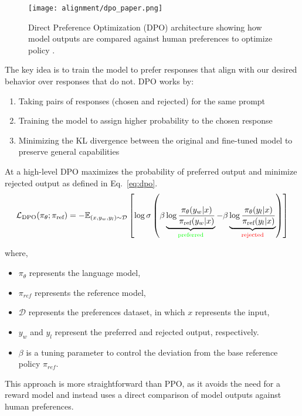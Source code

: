 \begin{figure}[H]
\centering
\texttt{[image: alignment/dpo\_paper.png]}
\caption{Direct Preference Optimization (DPO) architecture showing how model outputs are compared against human preferences to optimize policy \cite{rafailov2024directpreferenceoptimizationlanguage}.}
\label{fig:dpo-paper}
\end{figure}

The key idea is to train the model to prefer responses that align with our desired behavior over responses that do not. DPO works by:
\begin{enumerate}
\item Taking pairs of responses (chosen and rejected) for the same prompt
\item Training the model to assign higher probability to the chosen response
\item Minimizing the KL divergence between the original and fine-tuned model to preserve general capabilities
\end{enumerate}

At a high-level DPO maximizes the probability of preferred output and minimize rejected output as defined in Eq.~\ref{eq:dpo}.
\begin{equation}\label{eq:dpo}
\mathcal{L}_{\text{DPO}}(\pi_\theta; \pi_\text{ref}) = -\mathbb{E}_{(x,y_w,y_l) \sim \mathcal{D}} \left[\log \sigma \left(\beta \underbrace{\log \frac{\pi_\theta(y_w | x)}{\pi_\text{ref}(y_w | x)}}_{\color{green}\text{preferred}} - \beta \underbrace{\log \frac{\pi_\theta(y_l | x)}{\pi_\text{ref}(y_l | x)}}_{\color{red}\text{rejected}}\right)\right]
\end{equation}

where,
\begin{itemize}
\item $\pi_\theta$ represents the language model,
\item $\pi_{ref}$ represents the reference model,
\item $\mathcal{D}$ represents the preferences dataset, in which $x$ represents the input,
\item $y_w$ and $y_l$ represent the preferred and rejected output, respectively.
\item $\beta$ is a tuning parameter to control the deviation from the base reference policy $\pi_{ref}$.
\end{itemize}

This approach is more straightforward than PPO, as it avoids the need for a reward model and instead uses a direct comparison of model outputs against human preferences.

